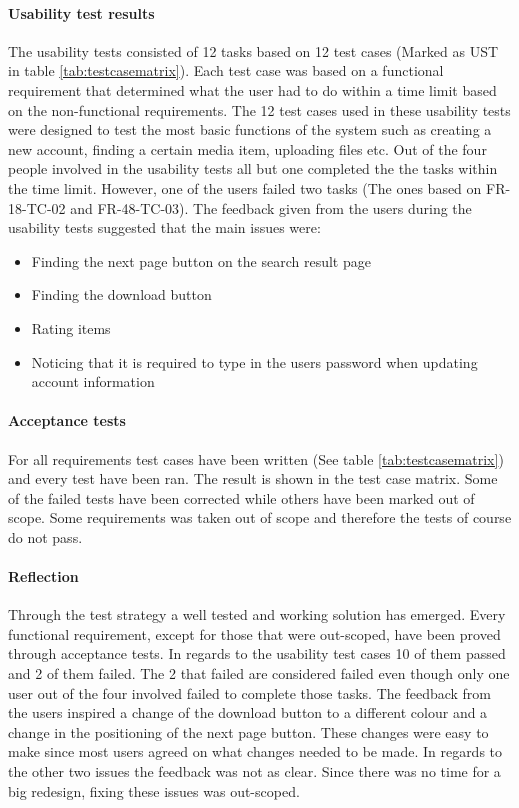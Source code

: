 \documentclass[../report.tex]{subfiles}
\begin{document}
\paragraph{Usability test results}
The usability tests consisted of 12 tasks based on 12 test cases (Marked as UST in table \ref{tab:testcasematrix}). Each test case was based on a functional requirement that determined what the user had to do within a time limit based on the non-functional requirements. The 12 test cases used in these usability tests were designed to test the most basic functions of the system such as creating a new account, finding a certain media item, uploading files etc. 
Out of the four people involved in the usability tests all but one completed the the tasks within the time limit. However, one of the users failed two tasks (The ones based on FR-18-TC-02 and FR-48-TC-03). The feedback given from the users during the usability tests suggested that the main issues were:
\begin{itemize}
\item Finding the next page button on the search result page
\item Finding the download button
\item Rating items
\item Noticing that it is required to type in the users password when updating account information
\end{itemize} 

\paragraph{Acceptance tests}
For all requirements test cases have been written (See table \ref{tab:testcasematrix}) and every test have been ran. The result is shown in the test case matrix. Some of the failed tests have been corrected while others have been marked out of scope. Some requirements was taken out of scope and therefore the tests of course do not pass.

\paragraph{Reflection}

Through the test strategy a well tested and working solution has emerged. Every functional requirement, except for those that were out-scoped, have been proved through acceptance tests.
In regards to the usability test cases 10 of them passed and 2 of them failed. The 2 that failed are considered failed even though only one user out of the four involved failed to complete those tasks. The feedback from the users inspired a change of the download button to a different colour and a change in the positioning of the next page button. These changes were easy to make since most users agreed on what changes needed to be made. In regards to the other two issues the feedback was not as clear. Since there was no time for a big redesign, fixing these issues was out-scoped.
\end{document}
